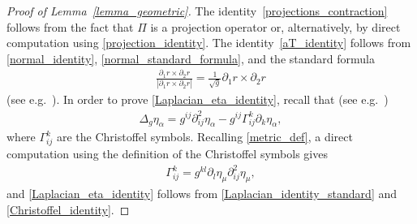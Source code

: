 \documentclass[10pt,reqno]{amsart}
\theoremstyle{plain}
\theoremstyle{definition}
\numberwithin{equation}{section}
\newcommand{\al}{\alpha}
\newcommand{\Ga}{\Gamma}
\begin{document}
\begin{proof}[Proof of Lemma~\ref{lemma_geometric}]
The identity~\eqref{projections_contraction} follows 
from the fact that $\Pi$ is a projection operator
or, alternatively, by direct computation using \eqref{projection_identity}.
The identity~\eqref{aT_identity} follows from \eqref{normal_identity}, \eqref{normal_standard_formula},
and the standard formula 
\begin{gather}
\frac{\partial_1 r \times \partial_2 r}{|\partial_1 r \times \partial_2 r|} =
\frac{1}{\sqrt{g}} \partial_1 r \times \partial_2 r
 \nonumber
 \end{gather}
(see e.g.~\cite{HanIsometricEmbedding}).
In order to prove \eqref{Laplacian_eta_identity}, recall that 
(see e.g.~\cite{HanIsometricEmbedding})
\begin{gather}
\Delta_g \eta_\al = g^{ij} \partial^2_{ij} \eta_\al - g^{ij} \Ga^k_{ij} \partial_k \eta_\al,
\label{Laplacian_identity_standard}
\end{gather}
where $\Ga^k_{ij}$ are the Christoffel symbols.
Recalling \eqref{metric_def},
a direct computation using the definition of the Christoffel symbols
gives 
\begin{gather}
\Ga_{ij}^k = g^{kl}\partial_l \eta_\mu \partial^2_{ij} \eta_\mu,
\label{Christoffel_identity}
\end{gather}
and \eqref{Laplacian_eta_identity} follows from \eqref{Laplacian_identity_standard}
and \eqref{Christoffel_identity}. 


\end{proof}
\end{document}
